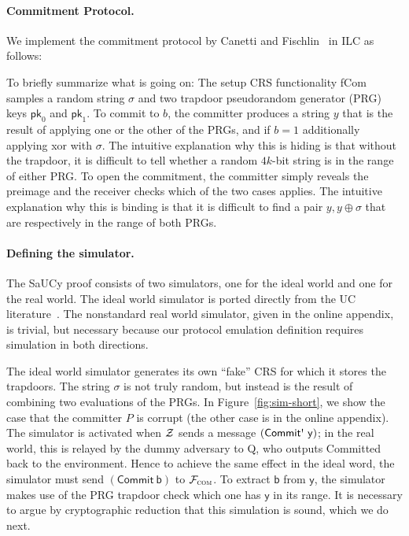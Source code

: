 \paragraph{Commitment Protocol.}
We implement the commitment protocol by Canetti and
Fischlin~\cite{canetti2001commitments} in ILC as follows:

To briefly summarize what is going on: The setup CRS functionality \textsf{fCom}
samples a random string $\sigma$ and two trapdoor pseudorandom generator (PRG) keys
$\mathsf{pk}_0$ and $\mathsf{pk}_1$.
To commit to $b$, the committer produces a string $y$ that is the result of applying one or the other of the PRGs, and if $b=1$ additionally applying xor with $\sigma$.
The intuitive explanation why this is hiding is that without the trapdoor, it is difficult to tell whether a random $4k$-bit string is in the range of either PRG. To open the commitment, the committer simply reveals the preimage and the receiver checks which of the two cases applies. The intuitive explanation why this is binding is that it is difficult to find a pair $y,y\oplus\sigma$ that are respectively in the range of both PRGs.

\paragraph{Defining the simulator.}
The SaUCy proof consists of two simulators, one for the ideal world and one for the real world.
The ideal world simulator is ported directly from the UC
literature~\cite{canetti2001commitments}. The nonstandard real world simulator,
given in the online appendix, is trivial, but necessary because our protocol emulation definition requires simulation in both directions.

The ideal world simulator generates its own ``fake'' CRS for which it stores the
trapdoors. The string $\sigma$ is not truly random, but instead is the result of
combining two evaluations of the PRGs. In Figure~\ref{fig:sim-short}, we show the
case that the committer $P$ is corrupt (the other case is in the online appendix). The
simulator is activated when $\mathcal{{Z}}$ sends a message $(\mathsf{Commit\text{\textquotesingle}~y})$;
in the real world, this is relayed by the dummy adversary to Q, who outputs
\textsf{Committed} back to the environment. Hence to achieve the same effect in
the ideal word, the simulator must send $(\mathsf{Commit~b})$ to
$\mathcal{{F}}_{\textsc{com}}$. To extract $\mathsf{b}$ from $\mathsf{y}$, the simulator makes use of the
PRG trapdoor check which one has $\mathsf{y}$ in its range.  It is necessary to argue by
cryptographic reduction that this simulation is sound, which we do next.

